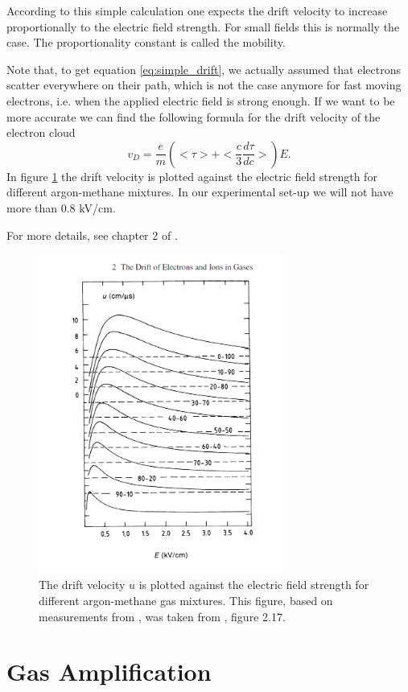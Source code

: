 \documentclass[12pt]{article}
\begin{document}
According to this simple calculation one expects the drift velocity to increase proportionally to the electric field strength. For small fields this is normally the case. The proportionality constant is called the mobility.

Note that, to get equation \eqref{eq:simple_drift}, we actually assumed that electrons scatter everywhere on their path, which is not the case anymore for fast moving electrons, i.e. when the applied electric field is strong enough. If we want to be more accurate we can find the following formula for the drift velocity of the electron cloud
\begin{equation}
    v_D = \frac{e}{m}( < \tau > + < \frac{c}{3}\frac{d\tau}{dc} > ) E.
\end{equation}
In figure \ref{fig:drift_electrons} the drift velocity is plotted against the electric field strength for different argon-methane mixtures. In our experimental set-up we will not have more than $0.8$ kV/cm.

For more details, see chapter 2 of \cite{DriftChamberBook}.
\begin{figure}[h]
    \centering
    \includegraphics[width=8cm]{pics/drift_electrons.png}
    \caption{The drift velocity $u$ is plotted against the electric field strength for different argon-methane gas mixtures. This figure, based on measurements from \cite{JeanMarieLepeltierHote}, was taken from \cite{DriftChamberBook}, figure 2.17.}
    \label{fig:drift_electrons}
\end{figure}

\section{Gas Amplification}
\end{document}
